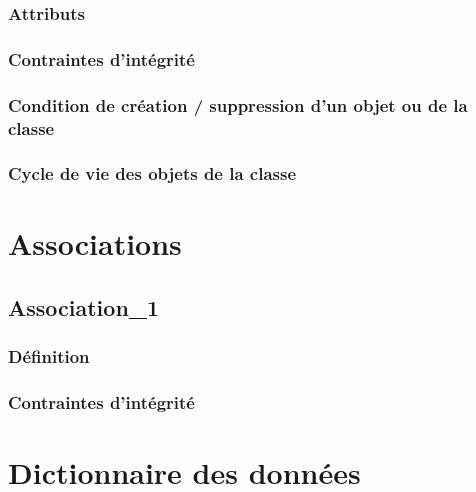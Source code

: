 \documentclass[a4paper, 11pt]{report}
\begin{document}
\subsubsection{Attributs}

\subsubsection{Contraintes d'intégrité}

\subsubsection{Condition de création / suppression d'un objet ou de la classe}

\subsubsection{Cycle de vie des objets de la classe}

\section{Associations}

\subsection{Association\_1}

\subsubsection{Définition}

\subsubsection{Contraintes d'intégrité}
\newpage
\section{Dictionnaire des données}
\end{document}
